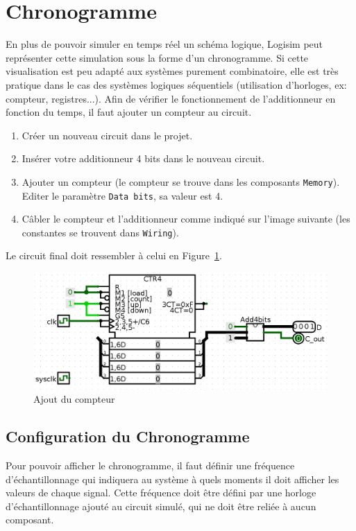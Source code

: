\documentclass[nosolution]{exercice}
\begin{document}
\newpage
\section{Chronogramme}
En plus de pouvoir simuler en temps réel un schéma logique, Logisim peut représenter cette simulation sous la forme d'un
chronogramme. Si cette visualisation est peu adapté aux systèmes purement combinatoire, elle est très pratique dans le
cas des systèmes logiques séquentiels (utilisation d'horloges, ex: compteur, registres...).
Afin de vérifier le fonctionnement de l'additionneur en fonction du temps, il faut ajouter un compteur au circuit.

\begin{enumerate}
\item Créer un nouveau circuit dans le projet.
\item Insérer votre additionneur 4 bits dans le nouveau circuit.
\item Ajouter un compteur (le compteur se trouve dans les composants \texttt{Memory}). Editer le paramètre \texttt{Data bits}, sa valeur est 4.
\item Câbler le compteur et l'additionneur comme indiqué sur l'image suivante (les constantes se trouvent dans \texttt{Wiring}).
\end{enumerate}

Le circuit final doit ressembler à celui en Figure~\ref{fig_logisim_addcpt}.

\begin{figure}[H]
\begin{center}
\includegraphics[width=450pt]{images/logisim_counter.png}
\caption{\label{fig_logisim_addcpt}Ajout du compteur}
\end{center}
\end{figure}


\subsection{Configuration du Chronogramme}
Pour pouvoir afficher le chronogramme, il faut définir une fréquence d'échantillonnage qui indiquera au système à quels
moments il doit afficher les valeurs de chaque signal. Cette fréquence doit être défini par une horloge d'échantillonnage
ajouté au circuit simulé, qui ne doit être reliée à aucun composant.
\end{document}
